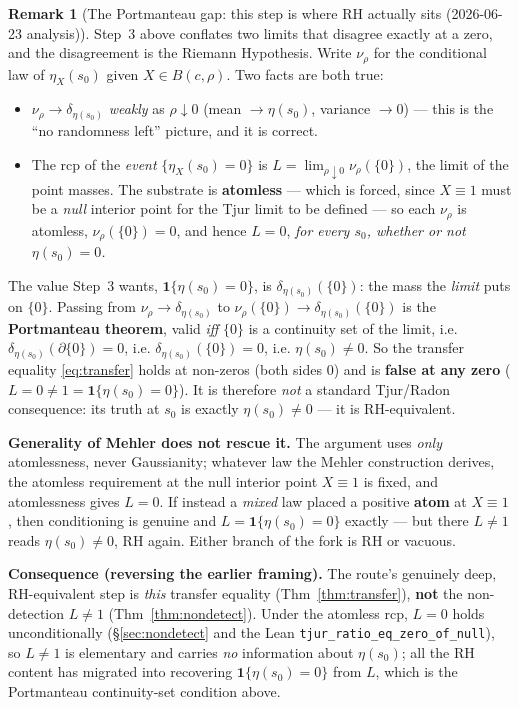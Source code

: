 \documentclass[11pt,a4paper]{article}
\theoremstyle{definition}
\newtheorem{remark}[theorem]{Remark}
\newcommand{\etaX}{\eta_X}
\begin{document}
\begin{remark}[The Portmanteau gap: this step is where RH actually sits (2026-06-23 analysis)]\label{rem:portmanteau}
Step~3 above conflates two limits that disagree exactly at a zero, and the disagreement is the
Riemann Hypothesis. Write \(\nu_\rho\) for the conditional law of \(\etaX(s_0)\) given
\(X\in B(c,\rho)\). Two facts are both true:
\begin{itemize}
  \item \(\nu_\rho \to \delta_{\eta(s_0)}\) \emph{weakly} as \(\rho\downarrow0\) (mean
        \(\to\eta(s_0)\), variance \(\to0\)) --- this is the ``no randomness left'' picture, and
        it is correct.
  \item The rcp of the \emph{event} \(\{\etaX(s_0)=0\}\) is \(L=\lim_{\rho\downarrow0}\nu_\rho(\{0\})\),
        the limit of the point masses. The substrate is \textbf{atomless} --- which is forced,
        since \(X\equiv1\) must be a \emph{null} interior point for the Tjur limit to be defined ---
        so each \(\nu_\rho\) is atomless, \(\nu_\rho(\{0\})=0\), and hence \(L=0\), \emph{for every
        \(s_0\), whether or not \(\eta(s_0)=0\).}
\end{itemize}
The value Step~3 wants, \(\mathbf{1}\{\eta(s_0)=0\}\), is \(\delta_{\eta(s_0)}(\{0\})\): the mass the
\emph{limit} puts on \(\{0\}\). Passing from \(\nu_\rho\to\delta_{\eta(s_0)}\) to
\(\nu_\rho(\{0\})\to\delta_{\eta(s_0)}(\{0\})\) is the \textbf{Portmanteau theorem}, valid \emph{iff}
\(\{0\}\) is a continuity set of the limit, i.e. \(\delta_{\eta(s_0)}(\partial\{0\})=0\), i.e.
\(\delta_{\eta(s_0)}(\{0\})=0\), i.e. \(\boxed{\eta(s_0)\neq0}\). So the transfer equality
\eqref{eq:transfer} holds at non-zeros (both sides \(0\)) and is \textbf{false at any zero}
(\(L=0\neq1=\mathbf{1}\{\eta(s_0)=0\}\)). It is therefore \emph{not} a standard Tjur/Radon
consequence: its truth at \(s_0\) is exactly \(\eta(s_0)\neq0\) --- it is RH-equivalent.

\textbf{Generality of Mehler does not rescue it.} The argument uses \emph{only} atomlessness, never
Gaussianity; whatever law the Mehler construction derives, the atomless requirement at the null
interior point \(X\equiv1\) is fixed, and atomlessness gives \(L=0\). If instead a \emph{mixed} law
placed a positive \textbf{atom} at \(X\equiv1\), then conditioning is genuine and \(L=\mathbf{1}\{\eta(s_0)=0\}\)
exactly --- but there \(L\neq1\) reads \(\eta(s_0)\neq0\), RH again. Either branch of the fork is RH or
vacuous.

\textbf{Consequence (reversing the earlier framing).} The route's genuinely deep, RH-equivalent step
is \emph{this} transfer equality (Thm~\ref{thm:transfer}), \textbf{not} the non-detection
\(L\neq1\) (Thm~\ref{thm:nondetect}). Under the atomless rcp, \(L=0\) holds unconditionally
(\S\ref{sec:nondetect} and the Lean \texttt{tjur\_ratio\_eq\_zero\_of\_null}), so \(L\neq1\) is
elementary and carries \emph{no} information about \(\eta(s_0)\); all the RH content has migrated into
recovering \(\mathbf{1}\{\eta(s_0)=0\}\) from \(L\), which is the Portmanteau continuity-set condition
above.
\end{remark}
\end{document}
